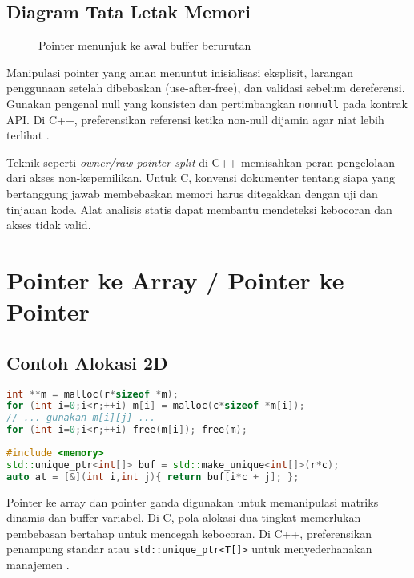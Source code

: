 \documentclass[../main.tex]{subfiles}
\begin{document}
\subsection{Diagram Tata Letak Memori}
\begin{figure}[h]
  \centering
  \caption{Pointer menunjuk ke awal buffer berurutan}
\end{figure}
Manipulasi pointer yang aman menuntut inisialisasi eksplisit, larangan penggunaan setelah dibebaskan (use-after-free), dan validasi sebelum dereferensi. Gunakan pengenal null yang konsisten dan pertimbangkan \texttt{nonnull} pada kontrak API. Di C++, preferensikan referensi ketika non-null dijamin agar niat lebih terlihat \parencite{gnu-c-manual,cpp-reference}.

Teknik seperti \emph{owner/raw pointer split} di C++ memisahkan peran pengelolaan dari akses non-kepemilikan. Untuk C, konvensi dokumenter tentang siapa yang bertanggung jawab membebaskan memori harus ditegakkan dengan uji dan tinjauan kode. Alat analisis statis dapat membantu mendeteksi kebocoran dan akses tidak valid.

\section{Pointer ke Array / Pointer ke Pointer}
\subsection{Contoh Alokasi 2D}
\begin{lstlisting}[language=C, caption={Matriks dinamis 2D di C (pointer ganda)}]
int **m = malloc(r*sizeof *m);
for (int i=0;i<r;++i) m[i] = malloc(c*sizeof *m[i]);
// ... gunakan m[i][j] ...
for (int i=0;i<r;++i) free(m[i]); free(m);
\end{lstlisting}

\begin{lstlisting}[language=C++, caption={std::unique_ptr<T[]> untuk buffer 2D datar}]
#include <memory>
std::unique_ptr<int[]> buf = std::make_unique<int[]>(r*c);
auto at = [&](int i,int j){ return buf[i*c + j]; };
\end{lstlisting}
Pointer ke array dan pointer ganda digunakan untuk memanipulasi matriks dinamis dan buffer variabel. Di C, pola alokasi dua tingkat memerlukan pembebasan bertahap untuk mencegah kebocoran. Di C++, preferensikan penampung standar atau \texttt{std::unique\_ptr<T[]>} untuk menyederhanakan manajemen \parencite{iso-c-draft-n1570,cpp-reference}.
\end{document}
